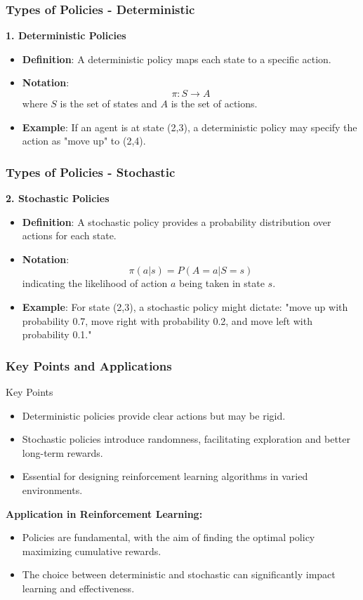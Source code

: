 \documentclass[aspectratio=169]{beamer}
\begin{document}
\begin{frame}[fragile]
    \frametitle{Types of Policies - Deterministic}
    \textbf{1. Deterministic Policies}
    \begin{itemize}
        \item \textbf{Definition}: A deterministic policy maps each state to a specific action.
        \item \textbf{Notation}: 
        \[
        \pi: S \rightarrow A
        \]
        where \( S \) is the set of states and \( A \) is the set of actions.

        \item \textbf{Example}: If an agent is at state (2,3), a deterministic policy may specify the action as "move up" to (2,4).
    \end{itemize}
\end{frame}

\begin{frame}[fragile]
    \frametitle{Types of Policies - Stochastic}
    \textbf{2. Stochastic Policies}
    \begin{itemize}
        \item \textbf{Definition}: A stochastic policy provides a probability distribution over actions for each state.
        \item \textbf{Notation}: 
        \[
        \pi(a | s) = P(A = a | S = s)
        \]
        indicating the likelihood of action \( a \) being taken in state \( s \).

        \item \textbf{Example}: For state (2,3), a stochastic policy might dictate: "move up with probability 0.7, move right with probability 0.2, and move left with probability 0.1."
    \end{itemize}
\end{frame}

\begin{frame}[fragile]
    \frametitle{Key Points and Applications}
    \begin{block}{Key Points}
        \begin{itemize}
            \item Deterministic policies provide clear actions but may be rigid.
            \item Stochastic policies introduce randomness, facilitating exploration and better long-term rewards.
            \item Essential for designing reinforcement learning algorithms in varied environments.
        \end{itemize}
    \end{block}
    
    \textbf{Application in Reinforcement Learning:}
    \begin{itemize}
        \item Policies are fundamental, with the aim of finding the optimal policy maximizing cumulative rewards.
        \item The choice between deterministic and stochastic can significantly impact learning and effectiveness.
    \end{itemize}
\end{frame}
\end{document}
